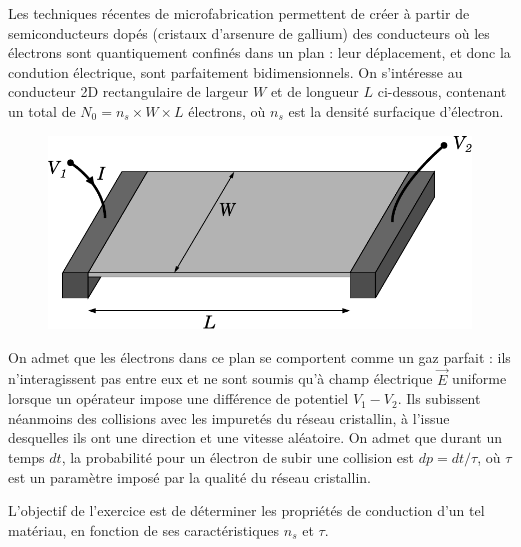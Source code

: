 \documentclass{report}
\begin{document}
Les techniques récentes de microfabrication permettent de créer à partir de semiconducteurs dopés (cristaux d'arsenure de gallium) des conducteurs où les électrons sont quantiquement confinés dans un plan : leur déplacement, et donc la condution électrique, sont parfaitement bidimensionnels. On s'intéresse au conducteur 2D rectangulaire de largeur $W$ et de longueur $L$ ci-dessous, contenant un total de $N_0=n_s\times W\times L$ électrons, où $n_s$ est la densité surfacique d'électron.

\begin{figure}[h!]
\centering
		\includegraphics[scale=0.5]{2DEG_square.pdf}
\end{figure}

On admet que les électrons dans ce plan se comportent comme un gaz parfait : ils n'interagissent pas entre eux et ne sont soumis qu'à champ électrique $\vec{E}$ uniforme lorsque un opérateur impose une différence de potentiel $V_1-V_2$. Ils subissent néanmoins des collisions avec les impuretés du réseau cristallin, à l'issue desquelles ils ont une direction et une vitesse aléatoire. On admet que durant un temps $dt$, la probabilité pour un électron de subir une collision est $dp = dt/\tau$, où $\tau$ est un paramètre imposé par la qualité du réseau cristallin.

L'objectif de l'exercice est de déterminer les propriétés de conduction d'un tel matériau, en fonction de ses caractéristiques $n_s$ et $\tau$.
\end{document}
